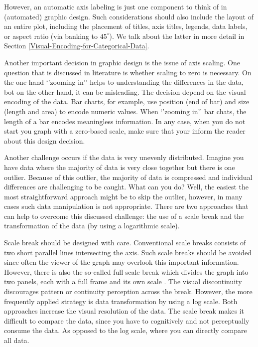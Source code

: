 \documentclass[
]{book}
\begin{document}
However, an automatic axis labeling is just one component to think of in (automated) graphic design. Such considerations should also include the layout of an entire plot, including the placement of titles, axis titles, legends, data labels, or aspect ratio (via banking to \(45^{\circ}\)). We talk about the latter in more detail in Section \ref{Visual-Encoding-for-Categorical-Data}.

Another important decision in graphic design is the issue of axis scaling. One question that is discussed in literature is whether scaling to zero is necessary. On the one hand `'zooming in'' helps to understanding the differences in the data, bot on the other hand, it can be misleading. The decision depend on the visual encoding of the data. Bar charts, for example, use position (end of bar) and size (length and area) to encode numeric values. When `'zooming in'' bar chats, the length of a bar encodes meaningless information. In any case, when you do not start you graph with a zero-based scale, make sure that your inform the reader about this design decision.

Another challenge occurs if the data is very unevenly distributed. Imagine you have data where the majority of data is very close together but there is one outlier. Because of this outlier, the majority of data is compressed and individual differences are challenging to be caught. What can you do? Well, the easiest the most straightforward approach might be to skip the outlier, however, in many cases such data manipulation is not appropriate. There are two approaches that can help to overcome this discussed challenge: the use of a scale break and the transformation of the data (by using a logarithmic scale).

Scale break should be designed with care. Conventional scale breaks consists of two short parallel lines intersecting the axis. Such scale breaks should be avoided since often the viewer of the graph may overlook this important information. However, there is also the so-called full scale break which divides the graph into two panels, each with a full frame and its own scale \citep{Cleveland1984fullscalebreaks}. The visual discontinuity discourages pattern or continuity perception across the break. However, the more frequently applied strategy is data transformation by using a log scale. Both approaches increase the visual resolution of the data. The scale break makes it difficult to compare the data, since you have to cognitively and not perceptually consume the data. As opposed to the log scale, where you can directly compare all data.
\end{document}
